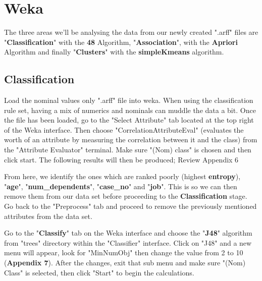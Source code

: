 \documentclass[12pt, a4paper]{article}
\begin{document}
    \section{Weka}
    The three areas we'll be analysing the data from our newly created ".arff" files are "\textbf{Classification}" with the \textbf{48} Algorithm, "\textbf{Association}", with the \textbf{Apriori} Algorithm and finally "\textbf{Clusters}" with the \textbf{simpleKmeans} algorithm.
    
    \subsection{Classification}
    Load the nominal values only ".arff" file into weka. When using the classification rule set, having a mix of numerics and nominals can muddle the data a bit. Once the file has been loaded, go to the "Select Attribute" tab located at the top right of the Weka interface. Then choose "CorrelationAttributeEval" (evaluates the worth of an attribute by measuring the correlation between it and the class) from the "Attribute Evaluator" terminal. Make sure "(Nom) class" is chosen and then click start. The following results will then be produced; Review Appendix 6 
    
    From here, we identify the ones which are ranked poorly (highest \textbf{entropy}), "\textbf{age}", "\textbf{num\_dependents}", "\textbf{case\_no}" and "\textbf{job}". This is so we can then remove them from our data set before proceeding to the \textbf{Classification} stage. Go back to the "Preprocess" tab and proceed to remove the previously mentioned attributes from the data set.
    
    Go to the "\textbf{Classify}" tab on the Weka interface and choose the "\textbf{J48}" algorithm from "trees" directory within the "Classifier" interface. Click on "J48" and a new menu will appear, look for "MinNumObj" then change the value from 2 to 10 (\textbf{Appendix 7}). After the changes, exit that sub menu and make sure "(Nom) Class"  is selected, then click "Start" to begin the calculations.
    
\end{document}
